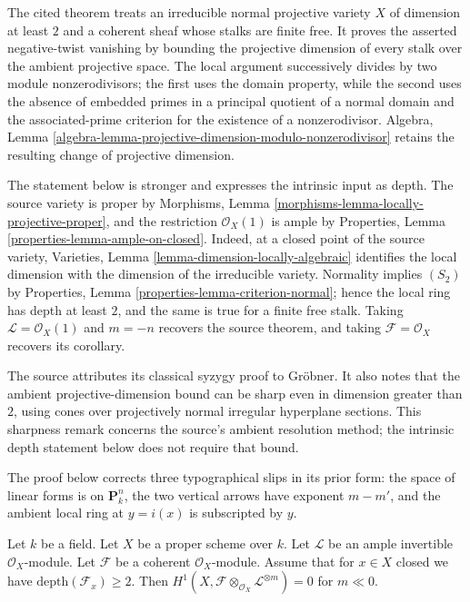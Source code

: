\begin{lemma}
\label{lemma-vanishin-h1-negative}
\begin{reference}
\cite[Chapter III, \S 5, no. 76, Theorem 4, Corollary, and Remarks,
pp. 270--271]{FAC}
\end{reference}
\begin{history}
The cited theorem treats an irreducible normal projective variety $X$ of
dimension at least $2$ and a coherent sheaf whose stalks are finite free. It
proves the asserted negative-twist vanishing by bounding the projective
dimension of every stalk over the ambient projective space. The local
argument successively divides by two module nonzerodivisors; the first uses
the domain property, while the second uses the absence of embedded primes in
a principal quotient of a normal domain and the associated-prime criterion
for the existence of a nonzerodivisor. Algebra, Lemma
\ref{algebra-lemma-projective-dimension-modulo-nonzerodivisor} retains the
resulting change of projective dimension.

The statement below is stronger and expresses the intrinsic input as depth.
The source variety is proper by Morphisms, Lemma
\ref{morphisms-lemma-locally-projective-proper}, and the restriction
$\mathcal{O}_X(1)$ is ample by Properties, Lemma
\ref{properties-lemma-ample-on-closed}.
Indeed, at a closed point of the source variety, Varieties, Lemma
\ref{lemma-dimension-locally-algebraic} identifies the local dimension with
the dimension of the irreducible variety. Normality implies $(S_2)$ by
Properties, Lemma \ref{properties-lemma-criterion-normal}; hence the local
ring has depth at least $2$, and the same is true for a finite free stalk.
Taking $\mathcal{L}=\mathcal{O}_X(1)$ and $m=-n$ recovers the source theorem,
and taking $\mathcal{F}=\mathcal{O}_X$ recovers its corollary.

The source attributes its classical syzygy proof to Gr\"obner. It also notes
that the ambient projective-dimension bound can be sharp even in dimension
greater than $2$, using cones over projectively normal irregular hyperplane
sections. This sharpness remark concerns the source's ambient resolution
method; the intrinsic depth statement below does not require that bound.

The proof below corrects three typographical slips in its prior form: the
space of linear forms is on $\mathbf{P}^n_k$, the two vertical arrows have
exponent $m-m'$, and the ambient local ring at $y=i(x)$ is subscripted by
$y$.
\end{history}
Let $k$ be a field. Let $X$ be a proper scheme over $k$. Let $\mathcal{L}$
be an ample invertible $\mathcal{O}_X$-module. Let $\mathcal{F}$ be a
coherent $\mathcal{O}_X$-module. Assume that
for $x \in X$ closed we have $\text{depth}(\mathcal{F}_x) \geq 2$.
Then
$H^1(X, \mathcal{F} \otimes_{\mathcal{O}_X} \mathcal{L}^{\otimes m}) = 0$
for $m \ll 0$.
\end{lemma}

